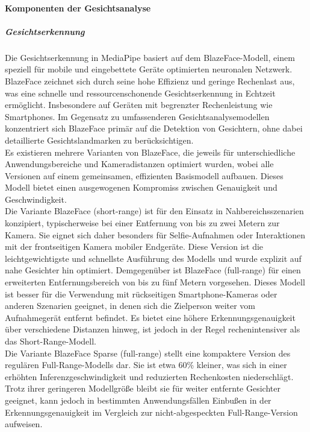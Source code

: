 \paragraph{Komponenten der Gesichtsanalyse}
\subparagraph{Gesichtserkennung}
Die Gesichtserkennung in MediaPipe basiert auf dem BlazeFace-Modell, einem speziell für mobile und eingebettete Geräte optimierten neuronalen Netzwerk. BlazeFace zeichnet sich durch seine hohe Effizienz und geringe Rechenlast aus, was eine schnelle und ressourcenschonende Gesichtserkennung in Echtzeit ermöglicht. Insbesondere auf Geräten mit begrenzter Rechenleistung wie Smartphones. Im Gegensatz zu umfassenderen Gesichtsanalysemodellen konzentriert sich BlazeFace primär auf die Detektion von Gesichtern, ohne dabei detaillierte Gesichtslandmarken zu berücksichtigen. \\
Es existieren mehrere Varianten von BlazeFace, die jeweils für unterschiedliche Anwendungsbereiche und Kameradistanzen optimiert wurden, wobei alle Versionen auf einem gemeinsamen, effizienten Basismodell aufbauen. Dieses Modell bietet einen ausgewogenen Kompromiss zwischen Genauigkeit und Geschwindigkeit. \\
Die Variante BlazeFace (short-range) ist für den Einsatz in Nahbereichsszenarien konzipiert, typischerweise bei einer Entfernung von bis zu zwei Metern zur Kamera. Sie eignet sich daher besonders für Selfie-Aufnahmen oder Interaktionen mit der frontseitigen Kamera mobiler Endgeräte. Diese Version ist die leichtgewichtigste und schnellste Ausführung des Modells und wurde explizit auf nahe Gesichter hin optimiert.
Demgegenüber ist BlazeFace (full-range) für einen erweiterten Entfernungsbereich von bis zu fünf Metern vorgesehen. Dieses Modell ist besser für die Verwendung mit rückseitigen Smartphone-Kameras oder anderen Szenarien geeignet, in denen sich die Zielperson weiter vom Aufnahmegerät entfernt befindet. Es bietet eine höhere Erkennungsgenauigkeit über verschiedene Distanzen hinweg, ist jedoch in der Regel rechenintensiver als das Short-Range-Modell. \\
Die Variante BlazeFace Sparse (full-range) stellt eine kompaktere Version des regulären Full-Range-Modells dar. Sie ist etwa 60\% kleiner, was sich in einer erhöhten Inferenzgeschwindigkeit und reduzierten Rechenkosten niederschlägt. Trotz ihrer geringeren Modellgröße bleibt sie für weiter entfernte Gesichter geeignet, kann jedoch in bestimmten Anwendungsfällen Einbußen in der Erkennungsgenauigkeit im Vergleich zur nicht-abgespeckten Full-Range-Version aufweisen. \\
